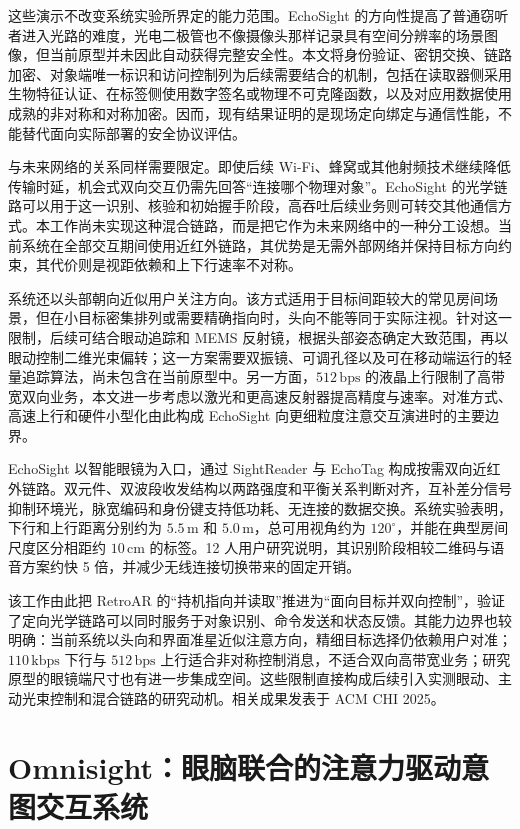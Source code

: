 这些演示不改变系统实验所界定的能力范围。EchoSight 的方向性提高了普通窃听者进入光路的难度，光电二极管也不像摄像头那样记录具有空间分辨率的场景图像，但当前原型并未因此自动获得完整安全性。本文将身份验证、密钥交换、链路加密、对象端唯一标识和访问控制列为后续需要结合的机制，包括在读取器侧采用生物特征认证、在标签侧使用数字签名或物理不可克隆函数，以及对应用数据使用成熟的非对称和对称加密。因而，现有结果证明的是现场定向绑定与通信性能，不能替代面向实际部署的安全协议评估。

与未来网络的关系同样需要限定。即使后续 Wi-Fi、蜂窝或其他射频技术继续降低传输时延，机会式双向交互仍需先回答“连接哪个物理对象”。EchoSight 的光学链路可以用于这一识别、核验和初始握手阶段，高吞吐后续业务则可转交其他通信方式。本工作尚未实现这种混合链路，而是把它作为未来网络中的一种分工设想。当前系统在全部交互期间使用近红外链路，其优势是无需外部网络并保持目标方向约束，其代价则是视距依赖和上下行速率不对称。

系统还以头部朝向近似用户关注方向。该方式适用于目标间距较大的常见房间场景，但在小目标密集排列或需要精确指向时，头向不能等同于实际注视。针对这一限制，后续可结合眼动追踪和 MEMS 反射镜，根据头部姿态确定大致范围，再以眼动控制二维光束偏转；这一方案需要双振镜、可调孔径以及可在移动端运行的轻量追踪算法，尚未包含在当前原型中。另一方面，$512\,\mathrm{bps}$ 的液晶上行限制了高带宽双向业务，本文进一步考虑以激光和更高速反射器提高精度与速率。对准方式、高速上行和硬件小型化由此构成 EchoSight 向更细粒度注意交互演进时的主要边界。


EchoSight 以智能眼镜为入口，通过 SightReader 与 EchoTag 构成按需双向近红外链路。双元件、双波段收发结构以两路强度和平衡关系判断对齐，互补差分信号抑制环境光，脉宽编码和身份键支持低功耗、无连接的数据交换。系统实验表明，下行和上行距离分别约为 $5.5\,\mathrm{m}$ 和 $5.0\,\mathrm{m}$，总可用视角约为 $120^\circ$，并能在典型房间尺度区分相距约 $10\,\mathrm{cm}$ 的标签。12 人用户研究说明，其识别阶段相较二维码与语音方案约快 5 倍，并减少无线连接切换带来的固定开销。

该工作由此把 RetroAR 的“持机指向并读取”推进为“面向目标并双向控制”，验证了定向光学链路可以同时服务于对象识别、命令发送和状态反馈。其能力边界也较明确：当前系统以头向和界面准星近似注意方向，精细目标选择仍依赖用户对准；$110\,\mathrm{kbps}$ 下行与 $512\,\mathrm{bps}$ 上行适合非对称控制消息，不适合双向高带宽业务；研究原型的眼镜端尺寸也有进一步集成空间。这些限制直接构成后续引入实测眼动、主动光束控制和混合链路的研究动机。相关成果发表于 ACM CHI 2025。

\section{Omnisight：眼脑联合的注意力驱动意图交互系统}\label{sec:omnisight-progress}

